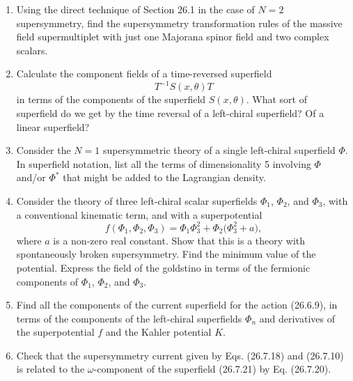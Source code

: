 

\begin{enumerate}
  \item Using the direct technique of Section 26.1 in the case of $N=2$
  supersymmetry, find the supersymmetry transformation rules of the
  massive field supermultiplet with just one Majorana spinor field and
  two complex scalars.

  \item Calculate the component fields of a time-reversed superfield
  \[
    T^{-1}S(x,\theta)T
  \]
  in terms of the components of the superfield $S(x,\theta)$. What sort
  of superfield do we get by the time reversal of a left-chiral
  superfield? Of a linear superfield?

  \item Consider the $N=1$ supersymmetric theory of a single left-chiral
  superfield $\Phi$. In superfield notation, list all the terms of
  dimensionality 5 involving $\Phi$ and/or $\Phi^*$ that might be added
  to the Lagrangian density.

  \item Consider the theory of three left-chiral scalar superfields
  $\Phi_1$, $\Phi_2$, and $\Phi_3$, with a conventional kinematic term,
  and with a superpotential
  \[
    f(\Phi_1,\Phi_2,\Phi_3)
    = \Phi_1\Phi_3^2+\Phi_2\bigl(\Phi_3^2+a\bigr),
  \]
  where $a$ is a non-zero real constant. Show that this is a theory with
  spontaneously broken supersymmetry. Find the minimum value of the
  potential. Express the field of the goldstino in terms of the
  fermionic components of $\Phi_1$, $\Phi_2$, and $\Phi_3$.

  \item Find all the components of the current superfield for the action
  (26.6.9), in terms of the components of the left-chiral superfields
  $\Phi_n$ and derivatives of the superpotential $f$ and the Kahler
  potential $K$.

  \item Check that the supersymmetry current given by Eqs. (26.7.18) and
  (26.7.10) is related to the $\omega$-component of the superfield
  (26.7.21) by Eq. (26.7.20).
\end{enumerate}


